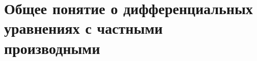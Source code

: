 \documentclass[../main.tex]{subfiles}
\begin{document}
\section{Общее понятие о дифференциальных уравнениях с частными производными}
\end{document}
